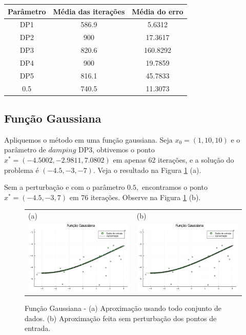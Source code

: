\documentclass[12pt,a4paper]{article}
\begin{document}
	\begin{table}[H]
		\centering
		\begin{tabular}{|c|c|c|}
			\hline
			Parâmetro & Média das iterações & Média do erro\\
			\hline
			
			DP1 & 586.9 & 5.6312\\
			\hline
			DP2 & 900 & 17.3617\\ \hline
			DP3 & 820.6 & 160.8292\\ \hline
			DP4 & 900 & 19.7859\\ \hline
			DP5 & 816.1 & 45.7833\\ \hline
			0.5 & 740.5 & 11.3073\\		\hline	
			
		\end{tabular}
	\end{table}

	\subsection{Função Gaussiana} \label{gau}
	Apliquemos o método em uma função gaussiana. Seja $x_0 = (1, 10, 10)$ e o parâmetro de $damping$ DP3, obtivemos o ponto $x^* = (-4.5002, -2.9811,7.0802)$ em apenas 62 iterações, e a solução do problema é $(-4.5, -3, -7).$ Veja o resultado na Figura \ref{fig4} (a).
	
	Sem a perturbação e com o parâmetro $0.5,$ encontramos o ponto $x^* = (-4.5,-3, 7)$ em 76 iterações. Observe na Figura \ref{fig4} (b).
	
	\begin{figure}[H]
		\centering 
		\begin{tabular}{ll}
			
			(a)& (b)   \\
			
			\includegraphics[width=0.45\linewidth]{7.png} & \includegraphics[width=0.45\linewidth]{8.png}\\ 
			
		\end{tabular}
		\caption{Função Gaussiana - (a) Aproximação usando todo conjunto de dados. (b) Aproximação feita sem perturbação dos pontos de entrada.}
		\label{fig4}
	\end{figure}
	
\end{document}
